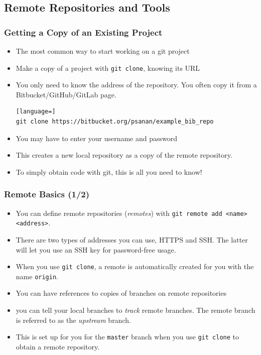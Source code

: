 \documentclass{beamer}
\begin{document}
\subsection{Remote Repositories and Tools}

\begin{frame}[fragile]
\frametitle{Getting a Copy of an Existing Project}
\begin{itemize}
\item
The most common way to start working on a git project
\item Make a copy of a project with \lstinline{git clone}, knowing its URL
\item You only need to know the address of the repository. You often copy it from a Bitbucket/GitHub/GitLab page.
\begin{lstlisting}[language=]
git clone https://bitbucket.org/psanan/example_bib_repo
\end{lstlisting}
\item You may have to enter your username and password
\item This creates a new local repository as a copy of the remote repository.
\item To simply obtain code with git, this is all you need to know!
\end{itemize}
\end{frame}

\begin{frame}[fragile]
\frametitle{Remote Basics (1/2)}
\begin{itemize}
\item
You can define remote repositories (\emph{remotes}) with \lstinline{git remote add <name> <address>}.
\item There are two types of addresses you can use, HTTPS and SSH. The latter will let you use an SSH key for password-free usage.
\item When you use \lstinline{git clone}, a remote is automatically created for you with the name \texttt{origin}.
\item You can have references to copies of branches on remote repositories
\item you can tell your local branches to \emph{track} remote branches. The remote branch is referred to as the \emph{upstream} branch.
\item This is set up for you for the \lstinline{master} branch when you use \lstinline{git clone} to obtain a remote repository.
\end{itemize}
\end{frame}
\end{document}
